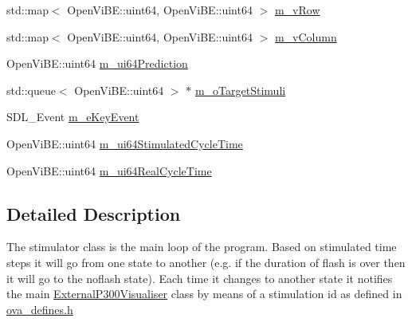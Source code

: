 \begin{DoxyCompactItemize}
\item 
std::map$<$ OpenViBE::uint64, OpenViBE::uint64 $>$ \hyperlink{classOpenViBEApplications_1_1ExternalP300Stimulator_a07d5caadf05e866a2b2c1612fc5e8b54}{m\_\-vRow}
\item 
std::map$<$ OpenViBE::uint64, OpenViBE::uint64 $>$ \hyperlink{classOpenViBEApplications_1_1ExternalP300Stimulator_a17b4c52e142fdc53a88a323cb21835a9}{m\_\-vColumn}
\item 
OpenViBE::uint64 \hyperlink{classOpenViBEApplications_1_1ExternalP300Stimulator_ab1ceebcf967da0ab943db6a0aae2f482}{m\_\-ui64Prediction}
\item 
std::queue$<$ OpenViBE::uint64 $>$ $\ast$ \hyperlink{classOpenViBEApplications_1_1ExternalP300Stimulator_adddda1526b8e85a75c7b4af1b9050cf1}{m\_\-oTargetStimuli}
\item 
SDL\_\-Event \hyperlink{classOpenViBEApplications_1_1ExternalP300Stimulator_a2dd1e7d4bb8759aa22f5f0f534f02f02}{m\_\-eKeyEvent}
\item 
OpenViBE::uint64 \hyperlink{classOpenViBEApplications_1_1ExternalP300Stimulator_a285d8a842a6ba67fef800ba58918cc49}{m\_\-ui64StimulatedCycleTime}
\item 
OpenViBE::uint64 \hyperlink{classOpenViBEApplications_1_1ExternalP300Stimulator_a3676a17fb84778af7f5202e48439bc93}{m\_\-ui64RealCycleTime}
\end{DoxyCompactItemize}


\subsection{Detailed Description}
The stimulator class is the main loop of the program. Based on stimulated time steps it will go from one state to another (e.g. if the duration of flash is over then it will go to the noflash state). Each time it changes to another state it notifies the main \hyperlink{classOpenViBEApplications_1_1ExternalP300Visualiser}{ExternalP300Visualiser} class by means of a stimulation id as defined in \hyperlink{ova__defines_8h}{ova\_\-defines.h} 


